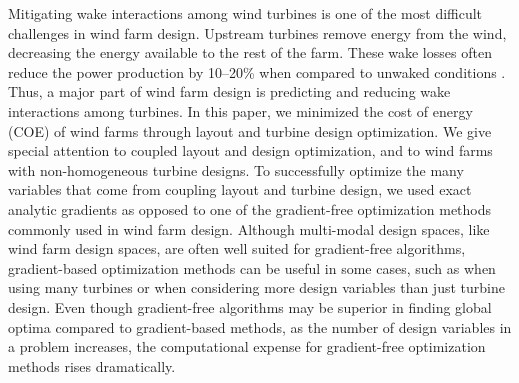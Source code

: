 
Mitigating wake interactions among wind turbines is one of the most difficult challenges in wind farm design. Upstream turbines remove energy from the wind, decreasing the energy available to the rest of the farm. These wake losses often reduce the power production by 10--20\% when compared to unwaked conditions \citep{barthelmie2007modelling,barthelmie2009modelling,briggs2013navigating}. 
Thus, a major part of wind farm design is predicting and reducing wake interactions among turbines. 
In this paper, we minimized the cost of energy (COE) of wind farms through layout and turbine design optimization. We give special attention to coupled layout and design optimization, and to wind farms with non-homogeneous turbine designs.
To successfully optimize the many variables that come from coupling layout and turbine design, we used exact analytic gradients as opposed to one of the gradient-free optimization methods commonly used in wind farm design.
Although multi-modal design spaces, like wind farm design spaces, are often well suited for gradient-free algorithms, gradient-based optimization methods can be useful in some cases, such as when using many turbines or when considering more design variables than just turbine design. Even though gradient-free algorithms may be superior in finding global optima compared to gradient-based methods, as the number of design variables in a problem increases, the computational expense for gradient-free optimization methods rises dramatically. 
